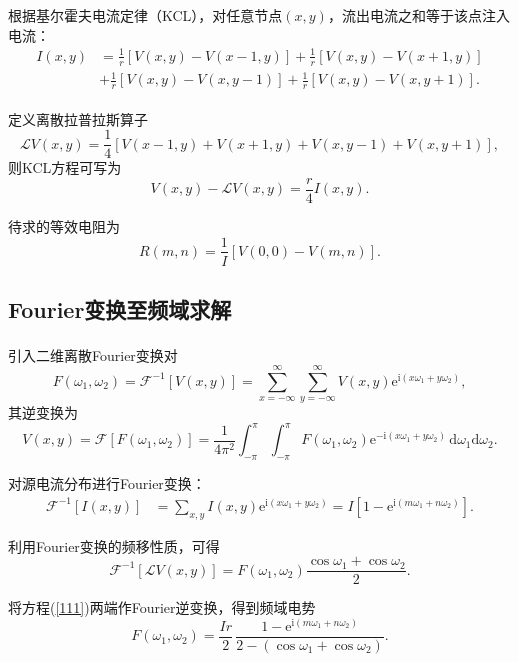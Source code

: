 \documentclass{article} %
\newcommand{\di}{\mathrm{d}}
\newcommand{\ii}{\mathrm{i}}
\newcommand{\e}[1]{\mathrm{e}^{#1}}
\newcommand{\f}[1]{\mathscr{F}\left[#1\right]}
\newcommand{\fo}[1]{\mathscr{F}^{-1}\left[#1\right]}
\begin{document}
根据基尔霍夫电流定律（KCL），对任意节点$(x,y)$，流出电流之和等于该点注入电流：
\begin{align}
  I(x,y)&=\frac{1}{r}\left[V(x,y)-V(x-1,y)\right]
        +\frac{1}{r}\left[V(x,y)-V(x+1,y)\right]\nonumber\\
        &+\frac{1}{r}\left[V(x,y)-V(x,y-1)\right]
        +\frac{1}{r}\left[V(x,y)-V(x,y+1)\right].
\end{align}

定义离散拉普拉斯算子\textsuperscript{\cite{shu2014}}
\begin{equation}
  \mathscr{L}V(x,y)=\frac{1}{4}\left[V(x-1,y)+V(x+1,y)
  +V(x,y-1)+V(x,y+1)\right],
\end{equation}
则KCL方程可写为
\begin{equation}
  \label{111}
  V(x,y)-\mathscr{L}V(x,y)=\dfrac{r}{4}I(x,y).
\end{equation}

待求的等效电阻为
\begin{equation}
  R(m,n)=\dfrac{1}{I}\left[V(0,0)-V(m,n)\right].
\end{equation}

\subsection{Fourier变换至频域求解}

引入二维离散Fourier变换对\textsuperscript{\cite{cserti2000}}
\begin{equation}
  F(\omega_1,\omega_2)=\fo{V(x,y)}
  =\sum_{x=-\infty}^{\infty}\sum_{y=-\infty}^{\infty}V(x,y)\e{\ii(x\omega_1+y\omega_2)},
\end{equation}
其逆变换为
\begin{equation}
  V(x,y)=\f{F(\omega_1,\omega_2)}
  =\frac{1}{4\pi^2}\int_{-\pi}^{\pi}\int_{-\pi}^{\pi}
  F(\omega_1,\omega_2)\e{-\ii(x\omega_1+y\omega_2)}\,\di\omega_1\di\omega_2.
\end{equation}

对源电流分布进行Fourier变换：
\begin{align}
  \fo{I(x,y)}
  &=\sum_{x,y}I(x,y)\e{\ii(x\omega_1+y\omega_2)}
  =I\left[1-\e{\ii(m\omega_1+n\omega_2)}\right].
\end{align}

利用Fourier变换的频移性质，可得
\begin{equation}
  \fo{\mathscr{L}V(x,y)}
  =F(\omega_1,\omega_2)\dfrac{\cos\omega_1+\cos\omega_2}{2}.
\end{equation}

将方程(\ref{111})两端作Fourier逆变换，得到频域电势
\begin{equation}
  F(\omega_1,\omega_2)=\dfrac{Ir}{2}\,
  \frac{1-\e{\ii(m\omega_1+n\omega_2)}}{2-(\cos\omega_1+\cos\omega_2)}.
\end{equation}
\end{document}
